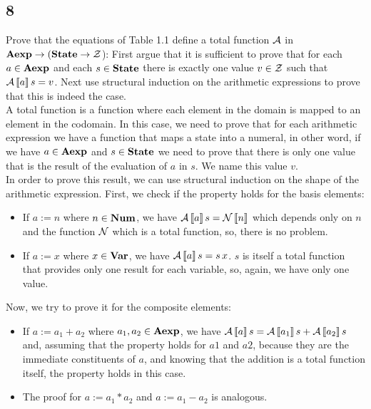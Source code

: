 \subsection{8}

Prove that the equations of Table 1.1 define a total function $\mathcal{A}$ in $\textbf{Aexp} \rightarrow (\textbf{State} \rightarrow \mathcal{Z}$): First argue that it is sufficient to prove that for each $a \in \textbf{Aexp}$ and each $s \in \textbf{State}$ there is exactly one value $v \in \mathcal{Z}$ such that $\mathcal{A}\left\llbracket a \right\rrbracket s = v$. Next use structural induction on the arithmetic expressions to prove that this is indeed the case.\\

A total function is a function where each element in the domain is mapped to an element in the codomain. In this case, we need to prove that for each arithmetic expression we have a function that maps a state into a numeral, in other word, if we have $a \in \textbf{Aexp}$ and $s \in \textbf{State}$ we need to prove that there is only one value that is the result of the evaluation of $a$ in $s$. We name this value $v$.\\

In order to prove this result, we can use structural induction on the shape of the arithmetic expression. First, we check if the property holds for the basis elements:
\begin{itemize}
	\item If $a := n$ where $n \in \textbf{Num}$, we have $\mathcal{A}\left\llbracket a \right\rrbracket s = \mathcal{N}\left\llbracket n \right\rrbracket$ which depends only on $n$ and the function $\mathcal{N}$ which is a total function, so, there is no problem.
	\item If $a := x$ where $x \in \textbf{Var}$, we have $\mathcal{A}\left\llbracket a \right\rrbracket s = s\,x$. $s$ is itself a total function that provides only one result for each variable, so, again, we have only one value.
\end{itemize}
Now, we try to prove it for the composite elements:
\begin{itemize}
	\item If $a := a_1 + a_2$ where $a_1, a_2 \in \textbf{Aexp}$, we have $\mathcal{A}\left\llbracket a \right\rrbracket s = \mathcal{A}\left\llbracket a_1 \right\rrbracket s + \mathcal{A}\left\llbracket a_2 \right\rrbracket s$ and, assuming that the property holds for $a1$ and $a2$, because they are the immediate constituents of $a$, and knowing that the addition is a total function itself, the property holds in this case.
	\item The proof for $a := a_1 * a_2$ and $a := a_1 - a_2$ is analogous.
\end{itemize}